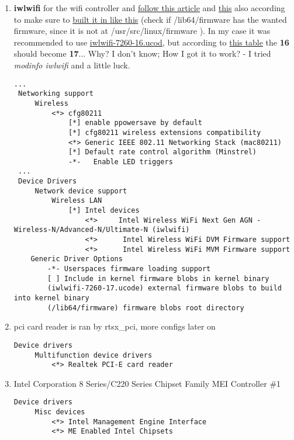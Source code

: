\documentclass[10pt,a4paper]{article}
\begin{document}
\begin{enumerate}
                    \newpage
                    \item \textbf{iwlwifi} for the wifi controller and  \href{https://wiki.gentoo.org/wiki/Iwlwifi#Kernel}{follow this article} and \href{https://wiki.gentoo.org/wiki/Wifi#Kernel}{this} also according to make sure to \href{https://wiki.gentoo.org/wiki/Iwlwifi#When_using_built-in_configuration}{built it in like this} (check if /lib64/firmware has the wanted firmware, since it is not at /usr/src/linux/firmware ). In my case it was recommended to use \href{https://wiki.gentoo.org/wiki/Lenovo_ThinkPad_T440s#Required_packages}{iwlwifi-7260-16.ucod}, but according to \href{https://wireless.wiki.kernel.org/en/users/drivers/iwlwifi#firmware}{this table} the \textbf{16} should become \textbf{17}... Why? I don't know; How I got it to work? - I tried
                    \textit{modinfo iwlwifi} and a little luck.
                    \begin{lstlisting}[style=KernelConfig]
 ...
 Networking support
     Wireless
         <*> cfg80211
             [*] enable ppowersave by default
             [*] cfg80211 wireless extensions compatibility
             <*> Generic IEEE 802.11 Networking Stack (mac80211)
             [*] Default rate control algorithm (Minstrel)
             -*-   Enable LED triggers
 ...
 Device Drivers
     Network device support
         Wireless LAN
             [*] Intel devices
                 <*>     Intel Wireless WiFi Next Gen AGN - Wireless-N/Advanced-N/Ultimate-N (iwlwifi)
                 <*>      Intel Wireless WiFi DVM Firmware support
                 <*>      Intel Wireless WiFi MVM Firmware support
    Generic Driver Options
        -*- Userspaces firmware loading support
        [ ] Include in kernel firmware blobs in kernel binary
        (iwlwifi-7260-17.ucode) external firmware blobs to build into kernel binary
        (/lib64/firmware) firmware blobs root directory
                    \end{lstlisting}

                \newpage
                \item pci card reader is ran by rtsx\_pci, more configs later on

                    \begin{lstlisting}[style=KernelConfig]
 Device drivers
     Multifunction device drivers
         <*> Realtek PCI-E card reader
                    \end{lstlisting}
                    
                \newpage
                \item Intel Corporation 8 Series/C220 Series Chipset Family MEI Controller \#1
                
                    \begin{lstlisting}[style=KernelConfig]
 Device drivers
     Misc devices
         <*> Intel Management Engine Interface
         <*> ME Enabled Intel Chipsets
                    \end{lstlisting}

                \end{enumerate}
\end{document}
